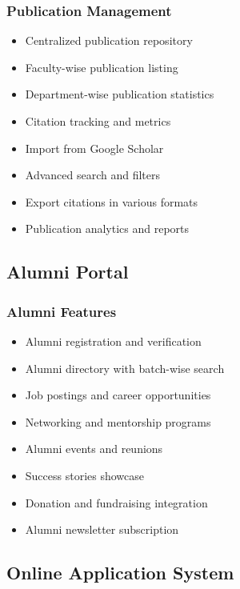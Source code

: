 \documentclass[12pt,a4paper]{report}
\begin{document}
\subsubsection*{Publication Management}
\begin{itemize}
    \item Centralized publication repository
    \item Faculty-wise publication listing
    \item Department-wise publication statistics
    \item Citation tracking and metrics
    \item Import from Google Scholar
    \item Advanced search and filters
    \item Export citations in various formats
    \item Publication analytics and reports
\end{itemize}

\subsection{Alumni Portal}

\subsubsection*{Alumni Features}
\begin{itemize}
    \item Alumni registration and verification
    \item Alumni directory with batch-wise search
    \item Job postings and career opportunities
    \item Networking and mentorship programs
    \item Alumni events and reunions
    \item Success stories showcase
    \item Donation and fundraising integration
    \item Alumni newsletter subscription
\end{itemize}

\subsection{Online Application System}
\end{document}

